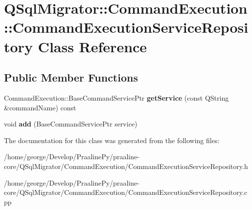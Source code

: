 \hypertarget{class_q_sql_migrator_1_1_command_execution_1_1_command_execution_service_repository}{}\section{Q\+Sql\+Migrator\+:\+:Command\+Execution\+:\+:Command\+Execution\+Service\+Repository Class Reference}
\label{class_q_sql_migrator_1_1_command_execution_1_1_command_execution_service_repository}
\subsection*{Public Member Functions}
\begin{DoxyCompactItemize}
\item 
\mbox{\label{class_q_sql_migrator_1_1_command_execution_1_1_command_execution_service_repository_a8ee67b70ed0a9ece4cbeb927dece8660}} 
Command\+Execution\+::\+Base\+Command\+Service\+Ptr {\bfseries get\+Service} (const Q\+String \&command\+Name) const
\item 
\mbox{\label{class_q_sql_migrator_1_1_command_execution_1_1_command_execution_service_repository_abd9a974dec7b53fecaddbfd9af2fd0ff}} 
void {\bfseries add} (Base\+Command\+Service\+Ptr service)
\end{DoxyCompactItemize}


The documentation for this class was generated from the following files\+:\begin{DoxyCompactItemize}
\item 
/home/george/\+Develop/\+Praaline\+Py/praaline-\/core/\+Q\+Sql\+Migrator/\+Command\+Execution/Command\+Execution\+Service\+Repository.\+h\item 
/home/george/\+Develop/\+Praaline\+Py/praaline-\/core/\+Q\+Sql\+Migrator/\+Command\+Execution/Command\+Execution\+Service\+Repository.\+cpp\end{DoxyCompactItemize}
